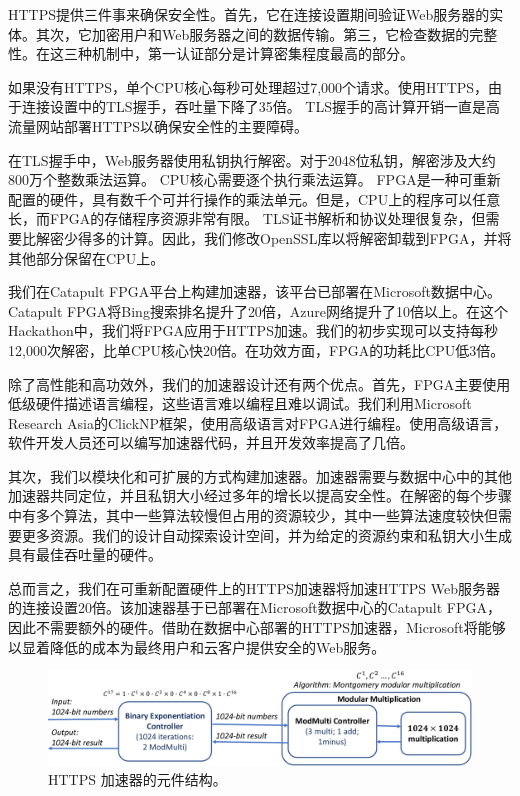 HTTPS提供三件事来确保安全性。首先，它在连接设置期间验证Web服务器的实体。其次，它加密用户和Web服务器之间的数据传输。第三，它检查数据的完整性。在这三种机制中，第一认证部分是计算密集程度最高的部分。

如果没有HTTPS，单个CPU核心每秒可处理超过7,000个请求。使用HTTPS，由于连接设置中的TLS握手，吞吐量下降了35倍。 TLS握手的高计算开销一直是高流量网站部署HTTPS以确保安全性的主要障碍。

在TLS握手中，Web服务器使用私钥执行解密。对于2048位私钥，解密涉及大约800万个整数乘法运算。 CPU核心需要逐个执行乘法运算。 FPGA是一种可重新配置的硬件，具有数千个可并行操作的乘法单元。但是，CPU上的程序可以任意长，而FPGA的存储程序资源非常有限。 TLS证书解析和协议处理很复杂，但需要比解密少得多的计算。因此，我们修改OpenSSL库以将解密卸载到FPGA，并将其他部分保留在CPU上。

我们在Catapult FPGA平台上构建加速器，该平台已部署在Microsoft数据中心。 Catapult FPGA将Bing搜索排名提升了20倍，Azure网络提升了10倍以上。在这个Hackathon中，我们将FPGA应用于HTTPS加速。我们的初步实现可以支持每秒12,000次解密，比单CPU核心快20倍。在功效方面，FPGA的功耗比CPU低3倍。

除了高性能和高功效外，我们的加速器设计还有两个优点。首先，FPGA主要使用低级硬件描述语言编程，这些语言难以编程且难以调试。我们利用Microsoft Research Asia的ClickNP框架，使用高级语言对FPGA进行编程。使用高级语言，软件开发人员还可以编写加速器代码，并且开发效率提高了几倍。

其次，我们以模块化和可扩展的方式构建加速器。加速器需要与数据中心中的其他加速器共同定位，并且私钥大小经过多年的增长以提高安全性。在解密的每个步骤中有多个算法，其中一些算法较慢但占用的资源较少，其中一些算法速度较快但需要更多资源。我们的设计自动探索设计空间，并为给定的资源约束和私钥大小生成具有最佳吞吐量的硬件。

总而言之，我们在可重新配置硬件上的HTTPS加速器将加速HTTPS Web服务器的连接设置20倍。该加速器基于已部署在Microsoft数据中心的Catapult FPGA，因此不需要额外的硬件。借助在数据中心部署的HTTPS加速器，Microsoft将能够以显着降低的成本为最终用户和云客户提供安全的Web服务。








\begin{figure}[htbp]
	\centering
	\includegraphics[width=1.0\textwidth]{image/https_accelerator}
	\caption{HTTPS 加速器的元件结构。}
	\label{clicknp:fig:https-accelerator}
\end{figure}

